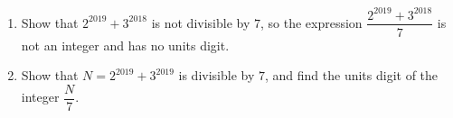 \begin{enumerate}
\item[(a)] Show that $2^{2019}+3^{2018}$ is not divisible by $7$, so the expression $\dfrac{2^{2019}+3^{2018}}{7}$ is not an integer and has no units digit.
\item[(b)] Show that $N=2^{2019}+3^{2019}$ is divisible by $7$, and find the units digit of the integer $\dfrac {N}{7}$.
\end{enumerate}
